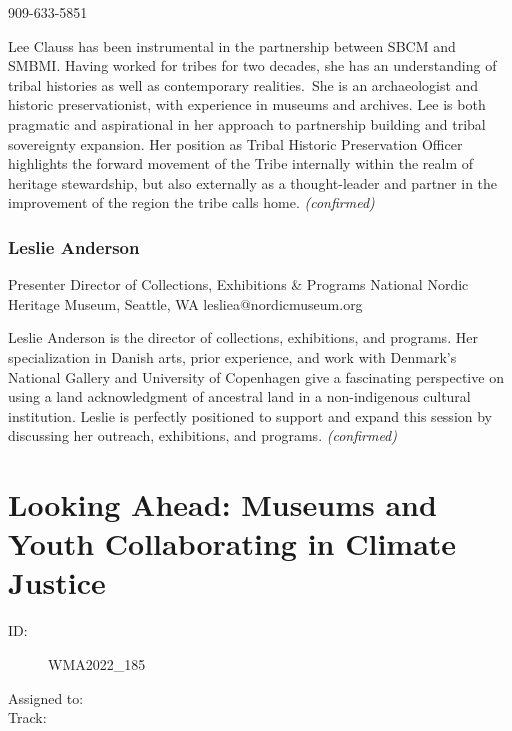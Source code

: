 \documentclass{report}
\begin{document}
                909-633-5851\newline

                Lee Clauss has been instrumental in the partnership between SBCM and SMBMI. Having worked for tribes for two decades, she has an understanding of tribal histories as well as contemporary realities. She is an archaeologist and historic preservationist, with experience in museums and archives. Lee is both pragmatic and aspirational in her approach to partnership building and tribal sovereignty expansion. Her position as Tribal Historic Preservation Officer highlights the forward movement of the Tribe internally within the realm of heritage stewardship, but also externally as a thought-leader and partner in the improvement of the region the tribe calls home.
                \emph{ (confirmed) }
              

              
                \subsubsection*{ Leslie  Anderson }
                Presenter\newline
                Director of Collections, Exhibitions \& Programs\newline
                National Nordic Heritage Museum, Seattle, WA
                \newline
                lesliea@nordicmuseum.org\newline
                
                

                Leslie Anderson is the director of collections, exhibitions, and programs. Her specialization in Danish arts, prior experience, and work with Denmark’s National Gallery and University of Copenhagen give a fascinating perspective on using a land acknowledgment of ancestral land in a non-indigenous cultural institution. Leslie is perfectly positioned to support and expand this session by discussing her outreach, exhibitions, and programs.
                \emph{ (confirmed) }
              

              

              
        
          \newpage
          \section{ Looking Ahead: Museums and Youth Collaborating in Climate Justice }
            \begin{description}
              \item [ID:]
              WMA2022\_185

              \item [Assigned to:]
                \item [Track:]
              \end{description}
\end{document}
